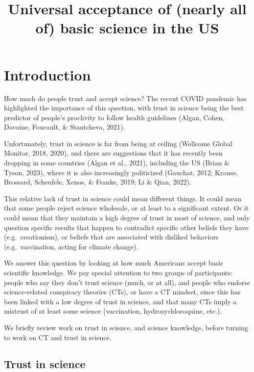 \documentclass[
  doc,floatsintext]{apa6}
\title{Universal acceptance of (nearly all of) basic science in the US}
\author{\textsuperscript{}}
\date{}
\affiliation{\vspace{0.5cm}\textsuperscript{} }
\begin{document}
\maketitle

\section{Introduction}\label{introduction}

How much do people trust and accept science? The recent COVID pandemic has highlighted the importance of this question, with trust in science being the best predictor of people's proclivity to follow health guidelines (Algan, Cohen, Davoine, Foucault, \& Stantcheva, 2021).

Unfortunately, trust in science is far from being at ceiling (Wellcome Global Monitor, 2018, 2020), and there are suggestions that it has recently been dropping in some countries (Algan et al., 2021), including the US (Brian \& Tyson, 2023), where it is also increasingly politicized (Gauchat, 2012; Krause, Brossard, Scheufele, Xenos, \& Franke, 2019; Li \& Qian, 2022).

This relative lack of trust in science could mean different things. It could mean that some people reject science wholesale, or at least to a significant extent. Or it could mean that they maintain a high degree of trust in most of science, and only question specific results that happen to contradict specific other beliefs they have (e.g.~creationism), or beliefs that are associated with disliked behaviors (e.g.~vaccination, acting for climate change).

We answer this question by looking at how much Americans accept basic scientific knowledge. We pay special attention to two groups of participants: people who say they don't trust science (much, or at all), and people who endorse science-related conspiracy theories (CTs), or have a CT mindset, since this has been linked with a low degree of trust in science, and that many CTs imply a mistrust of at least some science (vaccination, hydroxychloroquine, etc.).

We briefly review work on trust in science, and science knowledge, before turning to work on CT and trust in science.

\subsection{Trust in science}\label{trust-in-science}
\end{document}
